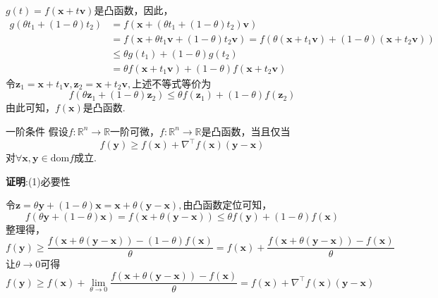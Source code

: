 $g(t)=f(\boldsymbol{x}+t\boldsymbol{v})$是凸函数，因此，\forall \theta \in \left[ 0,1 \right] 
$$
\begin{aligned}
g\left( \theta t_1+\left( 1-\theta \right) t_2 \right) &=f\left( \boldsymbol{x}+\left( \theta t_1+\left( 1-\theta \right) t_2 \right) \boldsymbol{v} \right) \\
&=f\left( \boldsymbol{x}+\theta t_1\boldsymbol{v}+\left( 1-\theta \right) t_2\boldsymbol{v} \right) =f\left( \theta \left( \boldsymbol{x}+t_1\boldsymbol{v} \right) +\left( 1-\theta \right) \left( \boldsymbol{x}+t_2\boldsymbol{v} \right) \right) \\
&\leqslant \theta g\left( t_1 \right) +\left( 1-\theta \right) g\left( t_2 \right)\\
&=\theta f\left( \boldsymbol{x}+t_1\boldsymbol{v} \right) +\left( 1-\theta \right) f\left( \boldsymbol{x}+t_2\boldsymbol{v} \right) 
\end{aligned}~
$$
令$\boldsymbol{z}_1=\boldsymbol{x}+t_1\boldsymbol{v},\boldsymbol{z}_2=\boldsymbol{x}+t_2\boldsymbol{v},$上述不等式等价为
$$
f\left( \theta \boldsymbol{z}_1+\left( 1-\theta \right) \boldsymbol{z}_2 \right) \leqslant \theta f\left( \boldsymbol{z}_1 \right) +\left( 1-\theta \right) f\left( \boldsymbol{z}_2 \right)~
$$
由此可知，$f(\boldsymbol{x})$是凸函数.
\begin{theorem}{一阶条件}
假设$f:\mathbb{R}^n\to\mathbb{R}$一阶可微，$f:\mathbb{R}^n\to\mathbb{R}$是凸函数，当且仅当
\begin{equation}
f(\boldsymbol{y})\geqslant f(\boldsymbol{x})+\nabla^\top f(\boldsymbol{x})(\boldsymbol{y}-\boldsymbol{x})~
\end{equation}
对$\forall\boldsymbol{x},\boldsymbol{y}\in\mathrm{dom} f$成立.
\end{theorem}
\textbf{证明}:(1)必要性

令$\boldsymbol{z}=\theta \boldsymbol{y}+\left( 1-\theta \right) \boldsymbol{x}=\boldsymbol{x}+\theta \left( \boldsymbol{y}-\boldsymbol{x} \right),$由凸函数定位可知，
$$
f\left( \theta \boldsymbol{y}+\left( 1-\theta \right) \boldsymbol{x} \right) =f\left( \boldsymbol{x}+\theta \left( \boldsymbol{y}-\boldsymbol{x} \right) \right) \leqslant \theta f\left( \boldsymbol{y} \right) +\left( 1-\theta \right) f\left( \boldsymbol{x} \right)~
$$
整理得，
$$
f\left( \boldsymbol{y} \right) \geqslant \frac{f\left( \boldsymbol{x}+\theta \left( \boldsymbol{y}-\boldsymbol{x} \right) \right) -\left( 1-\theta \right) f\left( \boldsymbol{x} \right)}{\theta}=f\left( \boldsymbol{x} \right) +\frac{f\left( \boldsymbol{x}+\theta \left( \boldsymbol{y}-\boldsymbol{x} \right) \right) -f\left( \boldsymbol{x} \right)}{\theta}~
$$
让$\theta\to 0$可得
$$
f\left( \boldsymbol{y} \right) \geqslant f\left( \boldsymbol{x} \right) +\lim_{\theta \rightarrow 0} \frac{f\left( \boldsymbol{x}+\theta \left( \boldsymbol{y}-\boldsymbol{x} \right) \right) -f\left( \boldsymbol{x} \right)}{\theta}=f\left( \boldsymbol{x} \right) +\nabla ^{\top}f\left( \boldsymbol{x} \right) \left( \boldsymbol{y}-\boldsymbol{x} \right)~
$$

